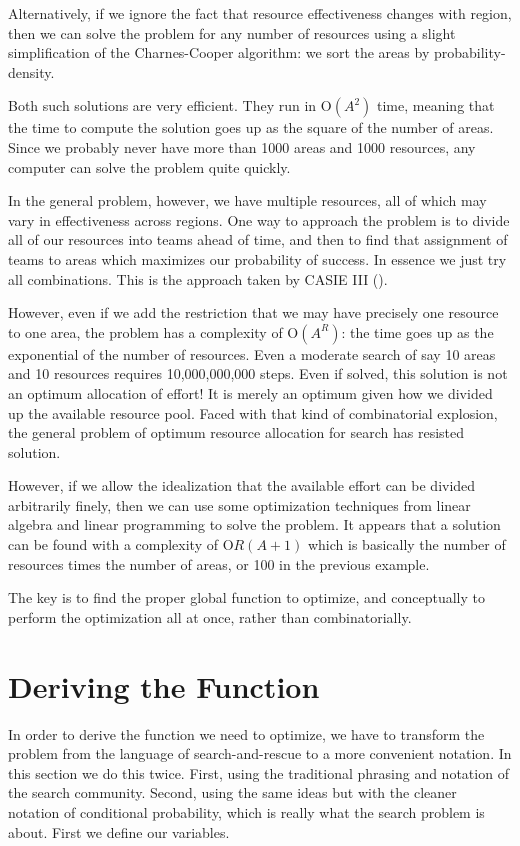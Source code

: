 \documentclass[10pt]{article}
\begin{document}
Alternatively, if we ignore the fact that resource effectiveness
changes with region, then we can solve the problem for any number of
resources using a slight simplification of the Charnes-Cooper
algorithm: we sort the areas by probability-density. 

Both such solutions are very efficient. They run in O$(A^2)$ time,
meaning that the time to compute the solution goes up as the square of
the number of areas. Since we probably never have more than 1000 areas and 
1000 resources, any computer can solve the problem quite quickly.

In the general problem, however, we have multiple resources, all of
which may vary in effectiveness across regions. One way to approach
the problem is to divide all of our resources into teams ahead of
time, and then to find that assignment of teams to areas which
maximizes our probability of success. In essence we just try all
combinations. This is the approach taken by CASIE III (\cite{}). 

However, even if we add the restriction that we may have precisely one
resource to one area, the problem has a complexity of O$(A^R)$: the
time goes up as the exponential of the number of resources. Even a
moderate search of say 10 areas and 10 resources requires
10,000,000,000 steps. Even if solved, this solution is not an optimum
allocation of effort! It is merely an optimum given how we divided
up the available resource pool. Faced with that kind of combinatorial
explosion, the general problem of optimum resource allocation for
search has resisted solution.

However, if we allow the idealization that the available effort can be
divided arbitrarily finely, then we can use some optimization
techniques from linear algebra and linear programming to solve the
problem. It appears that a solution can be found with a complexity of
O$R(A+1)$ which is basically the number of resources times the number
of areas, or 100 in the previous example.

The key is to find the proper global function to optimize, and
conceptually to perform the optimization all at once, rather than
combinatorially.

\section{Deriving the Function}
\label{sec:Deriving-Function}

In order to derive the function we need to optimize, we have to
transform the problem from the language of search-and-rescue to a more 
convenient notation. In this section we do this twice. First, using
the traditional phrasing and notation of the search community. Second,
using the same ideas but with the cleaner notation of conditional
probability, which is really what the search problem is about. First
we define our variables.
\end{document}
